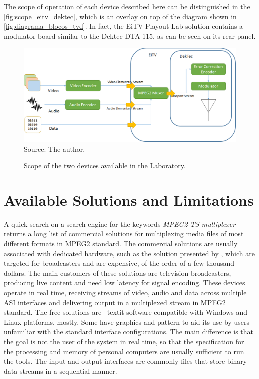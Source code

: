 \documentclass[
	12pt,				%
	openright,			%
	twoside,			%
	a4paper,			%
	brazil,
	french,				%
	english
	]{abntex2}
\begin{document}
The scope of operation of each device described here can be distinguished in the \autoref{fig:scope_eitv_dektec}, which is an overlay on top of the diagram shown in \autoref{fig:diagrama_blocos_tvd}. In fact, the EiTV Playout Lab solution contains a modulator board similar to the Dektec DTA-115, as can be seen on its rear panel.

\begin{figure}[!hb]
\centering
\caption{Scope of the two devices available in the Laboratory.}
\includegraphics[width=1\linewidth]{figuras/scope_eitv_dektec.png}
\\Source: The author.
\label{fig:scope_eitv_dektec}
\end{figure}

\chapter{Available Solutions and Limitations}



A quick search on a search engine for the keywords \textit{MPEG2 TS multiplexer} returns a long list of commercial solutions for multiplexing media files of most different formats in MPEG2 standard. The commercial solutions are usually associated with dedicated hardware, such as the solution presented by \cite{harris}, which are targeted for broadcasters and are expensive, of the order of a few thousand dollars. The main customers of these solutions are television broadcasters, producing live content and need low latency for signal encoding. These devices operate in real time, receiving streams of video, audio and data across multiple ASI interfaces and delivering output in a multiplexed stream in MPEG2 standard. The free solutions are \ textit {} software compatible with Windows and Linux platforms, mostly. Some have graphics and pattern to aid its use by users unfamiliar with the standard interface configurations. The main difference is that the goal is not the user of the system in real time, so that the specification for the processing and memory of personal computers are usually sufficient to run the tools. The input and output interfaces are commonly files that store binary data streams in a sequential manner.
\end{document}
